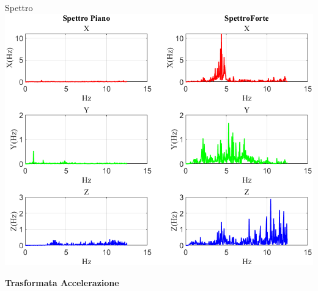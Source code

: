 \documentclass[beamer]{standalone}
\begin{document}
	\begin{frame}{{Spettro}}
		\centering\includegraphics[height=.8\textheight]{figure/Acc/Trasformata/Spettro}
	\end{frame}
	
	\begin{frame}
		\color{blue}\centering\huge{\textbf{Trasformata Accelerazione}}
	\end{frame}
	
\end{document}
